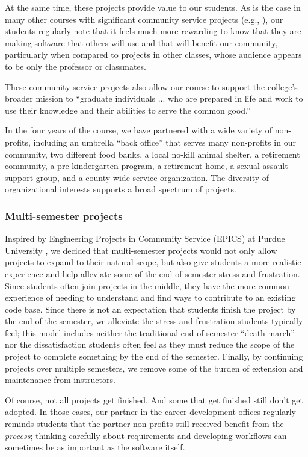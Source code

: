 At the same time, these projects provide value to our students.  As
is the case in many other courses with significant community service
projects (e.g., \cite{coyle-2005, hfoss-2018}), our students
regularly note that it feels much more rewarding to know that they are
making software that others will use and that will benefit our community,
particularly when compared to projects in other classes, whose audience
appears to be only the professor or classmates.

These community service projects also allow our course to support
the college's broader mission to ``graduate individuals ... who are
prepared in life and work to use their knowledge and their abilities
to serve the common good.'' \cite{grinnell-mission}

In the four years of the course, we have partnered with a wide
variety of non-profits, including an umbrella ``back office'' that
serves many non-profits in our community, two different food banks,
a local no-kill animal shelter, a retirement community, a
pre-kindergarten program, a retirement home, a sexual assault support
group, and a county-wide service organization.  The diversity of
organizational interests supports a broad spectrum of projects.

\subsubsection{Multi-semester projects}

Inspired by Engineering Projects in Community Service (EPICS) at
Purdue University \cite{coyle-2005}, we decided that multi-semester
projects would not only allow projects to expand to their natural
scope, but also give students a more realistic experience and help
alleviate some of the end-of-semester stress and frustration.  Since
students often join projects in the middle, they have the more common
experience of needing to understand and find ways to contribute to
an existing code base.  Since there is not an expectation that
students finish the project by the end of the semester, we alleviate
the stress and frustration students typically feel; this model
includes neither the traditional end-of-semester ``death march''
nor the dissatisfaction students often feel as they must reduce the
scope of the project to complete something by the end of the semester.
Finally, by continuing projects over multiple semesters, we remove
some of the burden of extension and maintenance from instructors.

Of course, not all projects get finished.  And some that get finished
still don't get adopted.  In those cases, our partner in the 
career-development offices regularly reminds students that the
partner non-profits still received benefit from the \textit{process};
thinking carefully about requirements and developing workflows can
sometimes be as important as the software itself.

